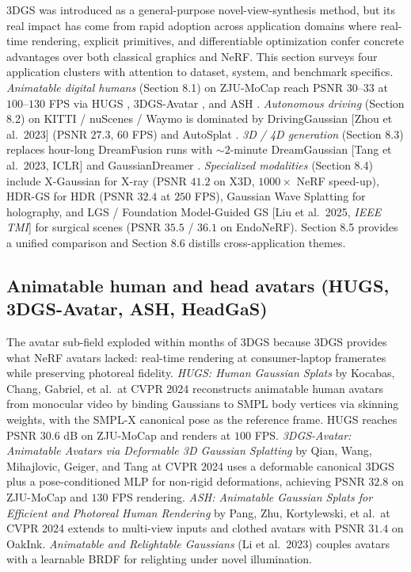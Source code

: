 \documentclass{article}
\begin{document}
3DGS was introduced as a general-purpose novel-view-synthesis method, but its real impact has come from rapid adoption across application domains where real-time rendering, explicit primitives, and differentiable optimization confer concrete advantages over both classical graphics and NeRF. This section surveys four application clusters with attention to dataset, system, and benchmark specifics. \emph{Animatable digital humans} (Section 8.1) on ZJU-MoCap reach PSNR \(30\)--\(33\) at \(100\)--\(130\) FPS via HUGS \cite{kocabas2024hugshumangaussians}, 3DGS-Avatar \cite{qian20243dgsavataranimatab}, and ASH \cite{pang2024ashanimatablegauss}. \emph{Autonomous driving} (Section 8.2) on KITTI / nuScenes / Waymo is dominated by DrivingGaussian {[}Zhou et al.~2023{]} (PSNR \(27.3\), \(60\) FPS) and AutoSplat \cite{khan2024autosplatconstrain}. \emph{3D / 4D generation} (Section 8.3) replaces hour-long DreamFusion runs with \(\sim\!2\)-minute DreamGaussian {[}Tang et al.~2023, ICLR{]} and GaussianDreamer \cite{yi2024gaussiandreamerfas}. \emph{Specialized modalities} (Section 8.4) include X-Gaussian \cite{cai2024hdrgsefficienthigh} for X-ray (PSNR \(41.2\) on X3D, \(1000\times\) NeRF speed-up), HDR-GS \cite{cai2024hdrgsefficienthigh} for HDR (PSNR \(32.4\) at \(250\) FPS), Gaussian Wave Splatting \cite{choi2025gaussianwavesplatt} for holography, and LGS \cite{liu2024lgsalightweight4dg} / Foundation Model-Guided GS {[}Liu et al.~2025, \emph{IEEE TMI}{]} for surgical scenes (PSNR \(35.5\) / \(36.1\) on EndoNeRF). Section 8.5 provides a unified comparison and Section 8.6 distills cross-application themes.

\subsection{Animatable human and head avatars (HUGS, 3DGS-Avatar, ASH, HeadGaS)}\label{animatable-human-and-head-avatars-hugs-3dgs-avatar-ash-headgas}

The avatar sub-field exploded within months of 3DGS because 3DGS provides what NeRF avatars lacked: real-time rendering at consumer-laptop framerates while preserving photoreal fidelity. \emph{HUGS: Human Gaussian Splats} by Kocabas, Chang, Gabriel, et al.~at CVPR 2024 \cite{kocabas2024hugshumangaussians} reconstructs animatable human avatars from monocular video by binding Gaussians to SMPL body vertices via skinning weights, with the SMPL-X canonical pose as the reference frame. HUGS reaches PSNR \(30.6\) dB on ZJU-MoCap and renders at \(100\) FPS. \emph{3DGS-Avatar: Animatable Avatars via Deformable 3D Gaussian Splatting} by Qian, Wang, Mihajlovic, Geiger, and Tang at CVPR 2024 \cite{qian20243dgsavataranimatab} uses a deformable canonical 3DGS plus a pose-conditioned MLP for non-rigid deformations, achieving PSNR \(32.8\) on ZJU-MoCap and \(130\) FPS rendering. \emph{ASH: Animatable Gaussian Splats for Efficient and Photoreal Human Rendering} by Pang, Zhu, Kortylewski, et al.~at CVPR 2024 \cite{pang2024ashanimatablegauss} extends to multi-view inputs and clothed avatars with PSNR \(31.4\) on OakInk. \emph{Animatable and Relightable Gaussians} (Li et al.~2023) couples avatars with a learnable BRDF for relighting under novel illumination.
\end{document}
